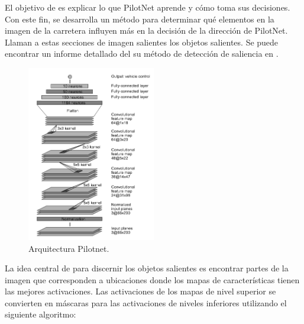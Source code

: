 El objetivo de \cite{explaining-end2end} es explicar lo que PilotNet aprende y cómo toma sus decisiones. Con este fin, se desarrolla un método para determinar qué elementos en la imagen de la carretera influyen más en la decisión de la dirección de PilotNet. Llaman a estas secciones de imagen salientes los objetos salientes. Se puede encontrar un informe detallado del su método de detección de saliencia en \cite{visual}.\\

\begin{figure}
\begin{center}
	\includegraphics[width=0.5\textwidth]{figures/Estado_arte/pilotnet.png}
   \caption{Arquitectura Pilotnet.}
	\label{fig.pilotnet}
\end{center}
\end{figure}

La idea central de \cite{explaining-end2end} para discernir los objetos salientes es encontrar partes de la imagen que corresponden a ubicaciones donde los mapas de características tienen las mejores activaciones. Las activaciones de los mapas de nivel superior se convierten en máscaras para las activaciones de niveles inferiores utilizando el siguiente algoritmo:

